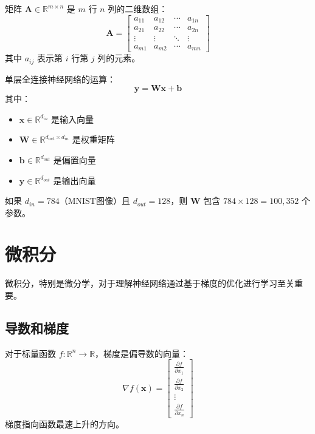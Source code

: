 \begin{definition}[矩阵]
矩阵 $\mathbf{A} \in \mathbb{R}^{m \times n}$ 是 $m$ 行 $n$ 列的二维数组：
\begin{equation}
\mathbf{A} = \begin{bmatrix}
a_{11} & a_{12} & \cdots & a_{1n} \\
a_{21} & a_{22} & \cdots & a_{2n} \\
\vdots & \vdots & \ddots & \vdots \\
a_{m1} & a_{m2} & \cdots & a_{mn}
\end{bmatrix}
\end{equation}
其中 $a_{ij}$ 表示第 $i$ 行第 $j$ 列的元素。
\end{definition}

\begin{example}[神经网络层作为矩阵运算]
单层全连接神经网络的运算：
\begin{equation}
\mathbf{y} = \mathbf{W}\mathbf{x} + \mathbf{b}
\end{equation}
其中：
\begin{itemize}
    \item $\mathbf{x} \in \mathbb{R}^{d_{in}}$ 是输入向量
    \item $\mathbf{W} \in \mathbb{R}^{d_{out} \times d_{in}}$ 是权重矩阵
    \item $\mathbf{b} \in \mathbb{R}^{d_{out}}$ 是偏置向量
    \item $\mathbf{y} \in \mathbb{R}^{d_{out}}$ 是输出向量
\end{itemize}
如果 $d_{in} = 784$（MNIST图像）且 $d_{out} = 128$，则 $\mathbf{W}$ 包含 $784 \times 128 = 100,352$ 个参数。
\end{example}

\section{微积分}

微积分，特别是微分学，对于理解神经网络通过基于梯度的优化进行学习至关重要。

\subsection{导数和梯度}

\begin{definition}[梯度]
对于标量函数 $f: \mathbb{R}^n \to \mathbb{R}$，梯度是偏导数的向量：
\begin{equation}
\nabla f(\mathbf{x}) = \begin{bmatrix}
\frac{\partial f}{\partial x_1} \\
\frac{\partial f}{\partial x_2} \\
\vdots \\
\frac{\partial f}{\partial x_n}
\end{bmatrix}
\end{equation}
梯度指向函数最速上升的方向。
\end{definition}

